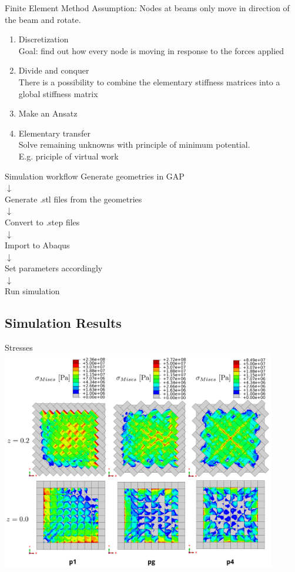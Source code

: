 \documentclass{beamer}
\numberwithin{equation}{aufgabe}
\begin{document}
\begin{frame}{Finite Element Method}
    Assumption: Nodes at beams only move in direction of the beam and rotate. \pause
    \begin{enumerate}
        \item Discretization \\ \pause
        Goal: find out how every node is moving in response to the forces applied \pause
        \item Divide and conquer \\ \pause
        There is a possibility to combine the elementary stiffness matrices into a global stiffness matrix \pause
        \item Make an Ansatz \pause
        \item Elementary transfer \\ \pause
        Solve remaining unknowns with principle of minimum potential. \\
        E.g. priciple of virtual work
    \end{enumerate}
\end{frame}

\begin{frame}{Simulation workflow}
    Generate geometries in GAP\\
    \pause $\downarrow$\\
    Generate .stl files from the geometries\\
    \pause $\downarrow$\\
    Convert to .step files \\
    \pause $\downarrow$\\
    Import to Abaqus\\
    \pause $\downarrow$\\
    Set parameters accordingly\\
    \pause $\downarrow$\\
    Run simulation
\end{frame}

\subsection{Simulation Results}
\begin{frame}{Stresses}
    \includegraphics[width=0.9\textwidth]{images/Sm.png}
\end{frame}
\end{document}
